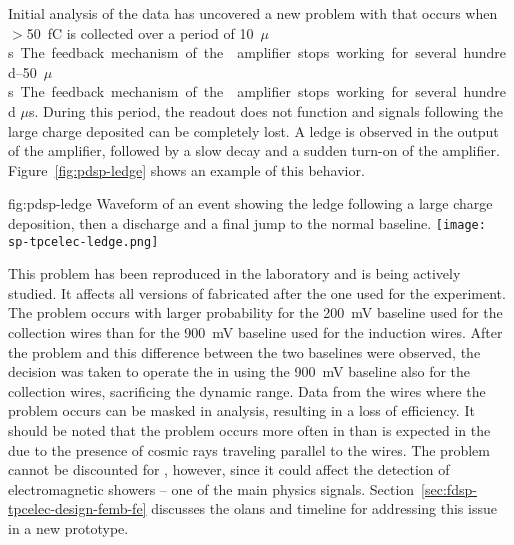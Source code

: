 Initial analysis of the  data has uncovered %
a new problem 
with  %
that occurs when %
$>$\SI{50}{fC} is collected over a period of \SIrange{10}{50}{$\mu$s}.
The feedback mechanism of the  amplifier 
stops working for %
several hundred $\mu$s.  %
During this period, the readout does not function %
and signals following 
the large charge deposited can %
be completely lost. A ledge is observed 
in the output of the  amplifier, followed by a slow decay 
and a sudden turn-on of the amplifier. %
Figure~\ref{fig:pdsp-ledge} shows an example of this behavior.

\begin{dunefigure}
{fig:pdsp-ledge}
{Waveform of an event showing the ledge following a large charge 
deposition, then a discharge and a final jump to the normal baseline.}
\texttt{[image: sp-tpcelec-ledge.png]}
\end{dunefigure}

This problem has been reproduced in the laboratory and is being actively 
studied. It affects all versions of  fabricated after 
the one used for the  experiment. The problem occurs 
with larger probability for the \SI{200}{mV} baseline used for the collection
wires than for the \SI{900}{mV} baseline used for the induction wires.
After the problem and this difference between the two baselines were 
observed, the decision was taken to operate the  in  
using the \SI{900}{mV} baseline also for the collection wires, sacrificing
the dynamic range. Data from the wires where the problem occurs can
be masked in analysis, resulting in a loss of efficiency. It should be
noted that the problem occurs more often in  %
than is expected in the  due to the presence of cosmic rays traveling parallel
to the  wires. %
The problem cannot be 
discounted for , however, since it could %
affect the detection
of electromagnetic showers -- one of the main physics signals.
Section~\ref{sec:fdsp-tpcelec-design-femb-fe} discusses the olans and timeline for addressing this issue in a new  prototype.

